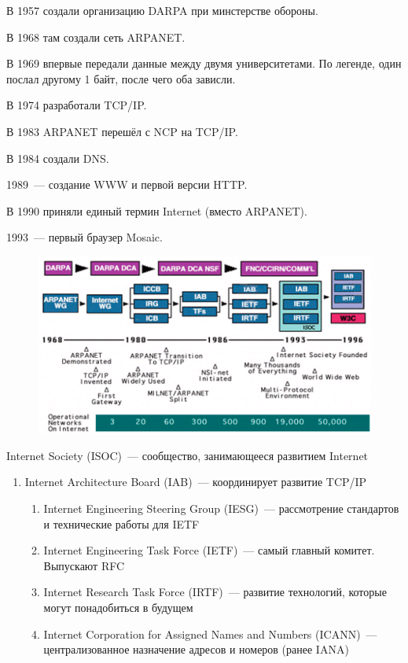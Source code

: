 
В 1957 создали организацию DARPA при минстерстве обороны.

В 1968 там создали сеть ARPANET.

В 1969 впервые передали данные между двумя университетами. По легенде, один послал другому 1 байт, после чего оба зависли.

В 1974 разработали TCP/IP. 

В 1983 ARPANET перешёл с NCP на TCP/IP.

В 1984 создали DNS.

1989~--- создание WWW и первой версии HTTP.

В 1990 приняли единый термин Internet (вместо ARPANET).

1993~--- первый браузер Mosaic.


\begin{figure}[H]
  \centering
  \includegraphics[width=15cm]{images/00/02}
\end{figure}



Internet Society (ISOC)~--- сообщество, занимающееся развитием Internet
\begin{enumerate}
    \item Internet Architecture Board (IAB)~--- координирует развитие TCP/IP
    \begin{enumerate}
        \item Internet Engineering Steering Group (IESG)~--- рассмотрение стандартов и технические работы для IETF
        \item Internet Engineering Task Force (IETF)~--- самый главный комитет. Выпускают RFC
        \item Internet Research Task Force (IRTF)~--- развитие технологий, которые могут понадобиться в будущем
        \item Internet Corporation for Assigned Names and Numbers (ICANN)~--- централизованное назначение адресов и номеров (ранее IANA)
    \end{enumerate}
\end{enumerate}

